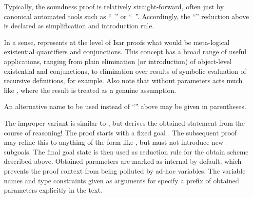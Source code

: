 \begin{isabellebody}
\begin{isamarkuptext}
  Typically, the soundness proof is relatively straight-forward, often
  just by canonical automated tools such as ``\mbox{}~'' or ``\mbox{}~''.  Accordingly, the
  ``'' reduction above is declared as simplification and
  introduction rule.

  In a sense, \mbox{} represents at the level of Isar
  proofs what would be meta-logical existential quantifiers and
  conjunctions.  This concept has a broad range of useful
  applications, ranging from plain elimination (or introduction) of
  object-level existential and conjunctions, to elimination over
  results of symbolic evaluation of recursive definitions, for
  example.  Also note that \mbox{} without parameters acts
  much like \mbox{}, where the result is treated as a
  genuine assumption.

  An alternative name to be used instead of ``'' above may
  be given in parentheses.

  \medskip The improper variant \mbox{} is similar to
  \mbox{}, but derives the obtained statement from the
  course of reasoning!  The proof starts with a fixed goal .  The subsequent proof may refine this to anything of the
  form like , but must not introduce new subgoals.  The
  final goal state is then used as reduction rule for the obtain
  scheme described above.  Obtained parameters  are marked as internal by default, which prevents the
  proof context from being polluted by ad-hoc variables.  The variable
  names and type constraints given as arguments for \mbox{}
  specify a prefix of obtained parameters explicitly in the text.


\end{isamarkuptext}
\end{isabellebody}
